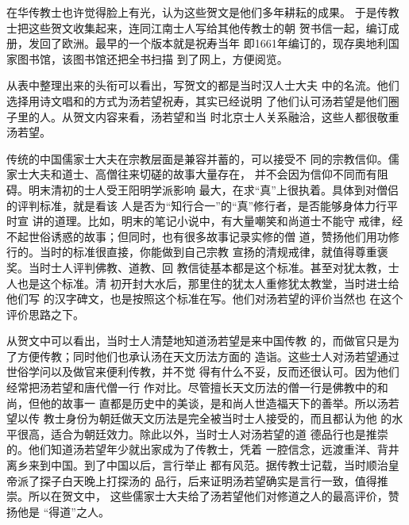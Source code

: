 \par
%
\par
在华传教士也许觉得脸上有光，认为这些贺文是他们多年耕耘的成果。%
于是传教士把这些贺文收集起来，连同江南士人写给其他传教士的朝%
贺书信一起，编订成册，发回了欧洲。最早的一个版本就是祝寿当年%
即1661年编订的，现存奥地利国家图书馆，该图书馆还把全书扫描%
到了网上，方便阅览。%
\par
从表中整理出来的头衔可以看出，写贺文的都是当时汉人士大夫%
中的名流。他们选择用诗文唱和的方式为汤若望祝寿，其实已经说明%
了他们认可汤若望是他们圈子里的人。从贺文内容来看，汤若望和当%
时北京士人关系融洽，这些人都很敬重汤若望。%
\par
传统的中国儒家士大夫在宗教层面是兼容并蓄的，可以接受不%
同的宗教信仰。儒家士大夫和道士、高僧往来切磋的故事大量存在，%
并不会因为信仰不同而有阻碍。明末清初的士人受王阳明学派影响%
最大，在求“真”上很执着。具体到对僧侣的评判标准，就是看该%
人是否为“知行合一”的“真”修行者，是否能够身体力行平时宣%
讲的道理。比如，明末的笔记小说中，有大量嘲笑和尚道士不能守%
戒律，经不起世俗诱惑的故事；但同时，也有很多故事记录实修的僧%
道，赞扬他们用功修行的。当时的标准很直接，你能做到自己宗教%
宣扬的清规戒律，就值得尊重褒奖。当时士人评判佛教、道教、回%
教信徒基本都是这个标准。甚至对犹太教，士人也是这个标准。清%
初开封大水后，那里住的犹太人重修犹太教堂，当时进士给他们写%
的汉字碑文，也是按照这个标准在写。他们对汤若望的评价当然也%
在这个评价思路之下。%
\par
从贺文中可以看出，当时士人清楚地知道汤若望是来中国传教%
的，而做官只是为了方便传教；同时他们也承认汤在天文历法方面的%
造诣。这些士人对汤若望通过世俗学问以及做官来便利传教，并不觉%
得有什么不妥，反而还很认可。因为他们经常把汤若望和唐代僧一行%
作对比。尽管擅长天文历法的僧一行是佛教中的和尚，但他的故事一%
直都是历史中的美谈，是和尚人世造福天下的善举。所以汤若望以传%
教士身份为朝廷做天文历法是完全被当时士人接受的，而且都认为他%
的水平很高，适合为朝廷效力。除此以外，当时士人对汤若望的道%
德品行也是推崇的。他们知道汤若望年少就出家成为了传教士，凭着%
一腔信念，远渡重洋、背井离乡来到中国。到了中国以后，言行举止%
都有风范。据传教士记载，当时顺治皇帝派了探子白天晚上打探汤的%
品行，后来证明汤若望确实是言行一致，值得推崇。所以在贺文中，%
这些儒家士大夫给了汤若望他们对修道之人的最高评价，赞扬他是%
“得道”之人。%

